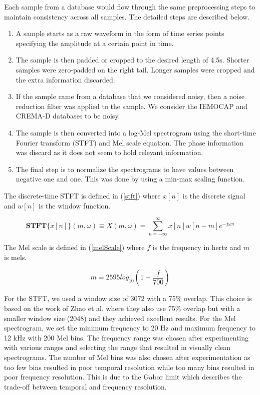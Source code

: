 \documentclass[conference]{IEEEtran}
\begin{document}
Each sample from a database would flow through the same preprocessing steps to maintain consistency across all samples. The detailed steps are described below.
\begin{enumerate}
	\item A sample starts as a raw waveform in the form of time series points specifying the amplitude at a certain point in time.
	\item The sample is then padded or cropped to the desired length of 4.5s. Shorter samples were zero-padded on the right tail. Longer samples were cropped and the extra information discarded.
	\item If the sample came from a database that we considered noisy, then a noise reduction filter was applied to the sample. We consider the IEMOCAP and CREMA-D databases to be noisy.
	\item The sample is then converted into a log-Mel spectrogram using the short-time Fourier transform (STFT) and Mel scale equation. The phase information was discard as it does not seem to hold relevant information. \cite{Kozakowski2017}
	\item The final step is to normalize the spectrograms to have values between negative one and one. This was done by using a min-max scaling function.
\end{enumerate}

The discrete-time STFT is defined in (\ref{stft}) where $x[n]$ is the discrete signal and $w[n]$ is the window function.

\begin{equation}
	\label{stft}
	\mathbf{STFT}\{x[n]\}(m,\omega) \equiv X(m,\omega) = \sum_{n=-\infty}^{\infty}x[n]w[n-m]e^{-j \omega n}
\end{equation}

The Mel scale is defined in (\ref{melScale}) where $f$ is the frequency in hertz and $m$ is mels.\cite{Oshaughnessy1990}

\begin{equation}
\label{melScale}
m = 2595 log_{10}(1 + \frac{f}{700})
\end{equation}

For the STFT, we used a window size of 3072 with a 75\% overlap. This choice is based on the work of Zhao et al. \cite{Zhao2019} where they also use 75\% overlap but with a smaller window size (2048) and they achieved excellent results. For the Mel spectrogram, we set the minimum frequency to 20 Hz and maximum frequency to 12 kHz with 200 Mel bins. The frequency range was chosen after experimenting with various ranges and selecting the range that resulted in visually clean spectrograms. The number of Mel bins was also chosen after experimentation as too few bins resulted in poor temporal resolution while too many bins resulted in poor frequency resolution. This is due to the Gabor limit which describes the trade-off between temporal and frequency resolution.
\end{document}
